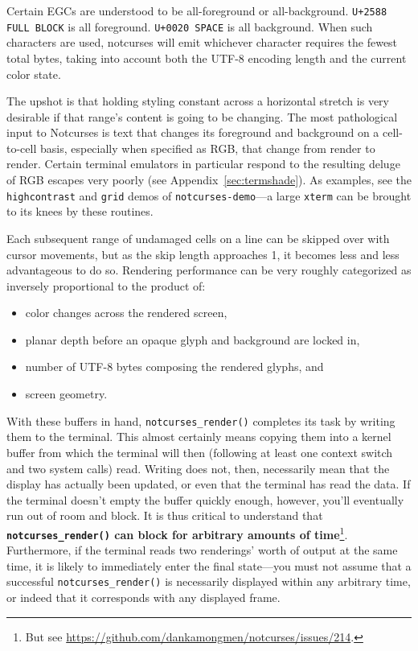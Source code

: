 \documentclass[letterpaper,10pt]{article}
\newenvironment{denseitemize}{
  \begin{itemize}
      \setlength{\itemsep}{0pt}
}{
  \end{itemize}
}
\begin{document}
Certain EGCs are understood to be all-foreground or all-background.
\texttt{U+2588 FULL BLOCK} is all foreground. \texttt{U+0020 SPACE} is all
background. When such characters are used, notcurses will emit whichever
character requires the fewest total bytes, taking into account both the
UTF-8 encoding length and the current color state.

The upshot is that holding styling constant across a horizontal stretch is
very desirable if that range's content is going to be changing. The most
pathological input to Notcurses is text that changes its foreground and background
on a cell-to-cell basis, especially when specified as RGB, that change from
render to render. Certain terminal emulators in particular respond to the
resulting deluge of RGB escapes very poorly (see Appendix~\ref{sec:termshade}).
As examples, see the \texttt{highcontrast} and \texttt{grid} demos of
\texttt{notcurses-demo}---a large \texttt{xterm} can be brought to its knees
by these routines.

Each subsequent range of undamaged cells on a line can be skipped over with
cursor movements, but as the skip length approaches 1, it becomes less and
less advantageous to do so. Rendering performance can be very roughly
categorized as inversely proportional to the product of:

\begin{denseitemize}
\item{color changes across the rendered screen,}
\item{planar depth before an opaque glyph and background are locked in,}
\item{number of UTF-8 bytes composing the rendered glyphs, and}
\item{screen geometry.}
\end{denseitemize}

With these buffers in hand, \texttt{notcurses\_render()} completes its task by
writing them to the terminal. This almost certainly means copying
them into a kernel buffer from which the terminal will then (following at
least one context switch and two system calls) read. Writing does not,
then, necessarily mean that the display has actually been updated, or even
that the terminal has read the data. If the terminal doesn't empty the buffer
quickly enough, however, you'll eventually run out of room and block. It is
thus critical to understand that \textbf{\texttt{notcurses\_render()} can block
for arbitrary amounts of time}\footnote{But see
\url{https://github.com/dankamongmen/notcurses/issues/214}.}. Furthermore,
if the terminal reads two renderings' worth of output at the same time, it is
likely to immediately enter the final state---you must not assume that a successful
\texttt{notcurses\_render()} is necessarily displayed within any arbitrary time,
or indeed that it corresponds with any displayed frame.
\end{document}
